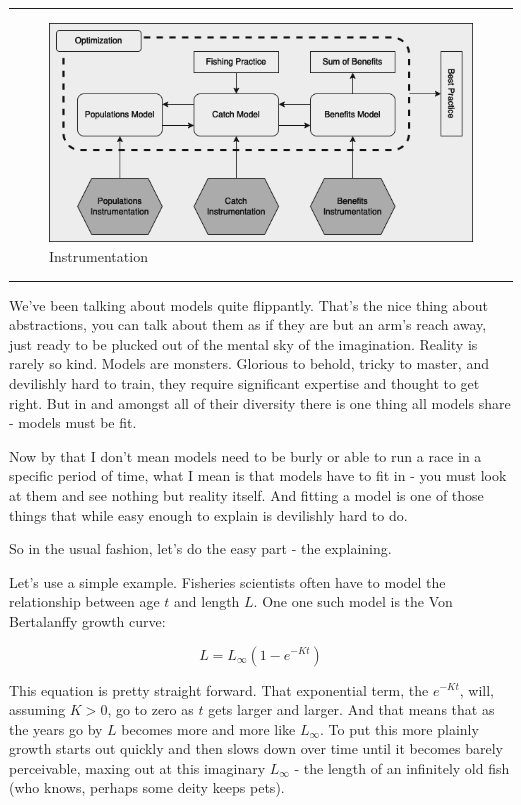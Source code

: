 \documentclass[11pt,a5paper]{book}
\begin{document}
\noindent \rule{\textwidth}{0.5pt} 
\begin{figure}[h!] 
  \includegraphics[width=\linewidth]{drawings/high_level_instrumentation.png}
  \caption{Instrumentation}
  \label{fig:high_level_instrumentation}
\end{figure}
\newline
\rule{\textwidth}{0.5pt} 
\vspace{5pt}

We've been talking about models quite flippantly. That's the nice thing about abstractions, you can talk about them as if they are but an arm's reach away, just ready to be plucked out of the mental sky of the imagination. Reality is rarely so kind. Models are monsters. Glorious to behold, tricky to master, and devilishly hard to train, they require significant expertise and thought to get right. But in and amongst all of their diversity there is one thing all models share - models must be fit.
\newline

Now by that I don't mean models need to be burly or able to run a race in a specific period of time, what I mean is that models have to fit in - you must look at them and see nothing but reality itself. And fitting a model is one of those things that while easy enough to explain is devilishly hard to do. 
\newline

So in the usual fashion, let's do the easy part - the explaining. 
\newline

Let's use a simple example. Fisheries scientists often have to model the relationship between age $t$ and length $L$. One one such model is the Von Bertalanffy growth curve:

$$L = L_{\infty}(1-e^{-Kt})$$

This equation is pretty straight forward. That exponential term, the $e^{-Kt}$, will, assuming $K>0$, go to zero as $t$ gets larger and larger. And that means that as the years go by $L$ becomes more and more like $L_{\infty}$. To put this more plainly growth starts out quickly and then slows down over time until it becomes barely perceivable, maxing out at this imaginary $L_{\infty}$ - the length of an infinitely old fish (who knows, perhaps some deity keeps pets). 
\newline
\end{document}
